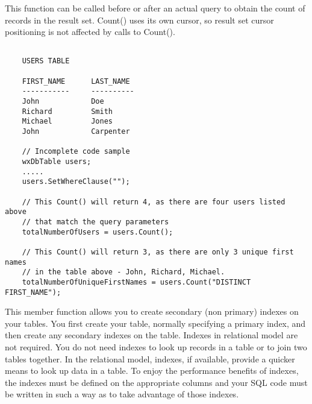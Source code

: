 
This function can be called before or after an actual query to obtain the 
count of records in the result set.  Count() uses its own cursor, so result
set cursor positioning is not affected by calls to Count().


\begin{verbatim}

    USERS TABLE

    FIRST_NAME      LAST_NAME
    -----------     ----------
    John            Doe    
    Richard         Smith
    Michael         Jones
    John            Carpenter

    // Incomplete code sample
    wxDbTable users;
    .....
    users.SetWhereClause("");

    // This Count() will return 4, as there are four users listed above
    // that match the query parameters
    totalNumberOfUsers = users.Count();

    // This Count() will return 3, as there are only 3 unique first names
    // in the table above - John, Richard, Michael.
    totalNumberOfUniqueFirstNames = users.Count("DISTINCT FIRST_NAME");
\end{verbatim}


\label{wxdbtablecreateindex}


This member function allows you to create secondary (non primary) indexes on 
your tables.  You first create your table, normally specifying a primary 
index, and then create any secondary indexes on the table.  Indexes in 
relational model are not required.  You do not need indexes to look up records 
in a table or to join two tables together.  In the relational model, indexes, 
if available, provide a quicker means to look up data in a table.  To enjoy 
the performance benefits of indexes, the indexes must be defined on the 
appropriate columns and your SQL code must be written in such a way as to 
take advantage of those indexes.



